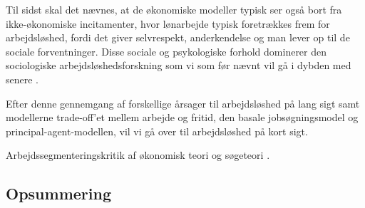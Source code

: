 Til sidst skal det nævnes, at de økonomiske modeller typisk ser også bort fra ikke-økonomiske incitamenter, hvor lønarbejde typisk foretrækkes frem for arbejdsløshed, fordi det giver selvrespekt, anderkendelse og man lever op til de sociale forventninger. Disse sociale og psykologiske forhold dominerer den sociologiske arbejdsløshedsforskning som vi som før nævnt vil gå i dybden med senere \parencite{Jahoda1971, Eisenberg1938, Ezzy1993, Halvorsen1999, Baum2001, Noerup2014}. %

Efter denne gennemgang af forskellige årsager til arbejdsløshed på lang sigt samt modellerne trade-off'et mellem arbejde og fritid, den basale jobsøgningsmodel og principal-agent-modellen, vil vi gå over til arbejdsløshed på kort sigt.

Arbejdssegmenteringskritik af økonomisk teori og søgeteori \parencite[1237-1241]{Cain1976}.


\subsection{Opsummering}


